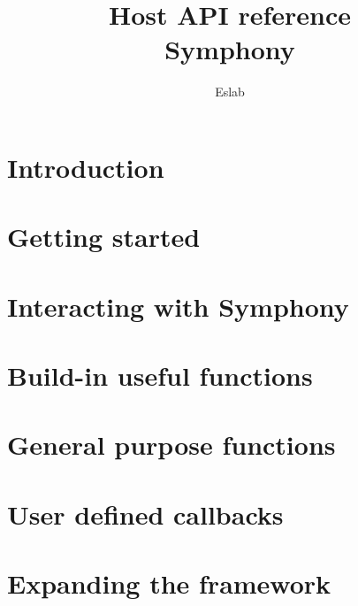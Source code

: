\documentclass{ol-softwaremanual}
\title{Host API reference \\Symphony}
\author{Eslab}
\begin{document}
\maketitle

\tableofcontents
\newpage

\section{Introduction}




\section{Getting started}
\label{sec:getting_started}


\section{Interacting with Symphony}



\section{Build-in useful functions}





\section{General purpose functions}








\section{User defined callbacks}


\section{Expanding the framework}


% 
\end{document}
